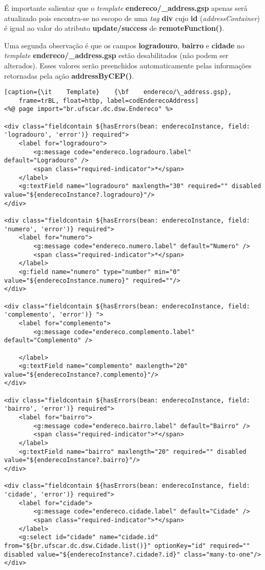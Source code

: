 É importante salientar que  o {\it template} {\bf endereco/\_address.gsp} apenas
será atualizado pois encontra-se no escopo  de uma {\it tag} {\bf div} cujo {\bf
  id} ({\it addressContainer}) é igual ao valor do atributo {\bf update/success}
de {\bf remoteFunction()}. 

Uma segunda  observação é que  os campos {\bf  logradouro}, {\bf bairro}  e {\bf
  cidade}  no {\it  template} {\bf  endereco/\_address.gsp}  estão desabilitados
(não  podem ser  alterados).   Esses valores  serão preenchidos  automaticamente
pelas informações retornadas pela ação {\bf addressByCEP()}.  

\begin{lstlisting}[caption={\it    Template}    {\bf    endereco/\_address.gsp},
    frame=trBL, float=htbp, label=codEnderecoAddress] 
<%@ page import="br.ufscar.dc.dsw.Endereco" %>

<div class="fieldcontain ${hasErrors(bean: enderecoInstance, field: 'logradouro', 'error')} required">
	<label for="logradouro">
		<g:message code="endereco.logradouro.label" default="Logradouro" />
		<span class="required-indicator">*</span>
	</label>
	<g:textField name="logradouro" maxlength="30" required="" disabled value="${enderecoInstance?.logradouro}"/>
</div>

<div class="fieldcontain ${hasErrors(bean: enderecoInstance, field: 'numero', 'error')} required">
	<label for="numero">
		<g:message code="endereco.numero.label" default="Numero" />
		<span class="required-indicator">*</span>
	</label>
	<g:field name="numero" type="number" min="0" value="${enderecoInstance.numero}" required=""/>
</div>

<div class="fieldcontain ${hasErrors(bean: enderecoInstance, field: 'complemento', 'error')} ">
	<label for="complemento">
		<g:message code="endereco.complemento.label" default="Complemento" />
		
	</label>
	<g:textField name="complemento" maxlength="20" value="${enderecoInstance?.complemento}"/>
</div>

<div class="fieldcontain ${hasErrors(bean: enderecoInstance, field: 'bairro', 'error')} required">
	<label for="bairro">
		<g:message code="endereco.bairro.label" default="Bairro" />
		<span class="required-indicator">*</span>
	</label>
	<g:textField name="bairro" maxlength="20" required="" disabled value="${enderecoInstance?.bairro}"/>
</div>

<div class="fieldcontain ${hasErrors(bean: enderecoInstance, field: 'cidade', 'error')} required">
	<label for="cidade">
		<g:message code="endereco.cidade.label" default="Cidade" />
		<span class="required-indicator">*</span>
	</label>
	<g:select id="cidade" name="cidade.id" from="${br.ufscar.dc.dsw.Cidade.list()}" optionKey="id" required="" disabled value="${enderecoInstance?.cidade?.id}" class="many-to-one"/>
</div>
\end{lstlisting}

